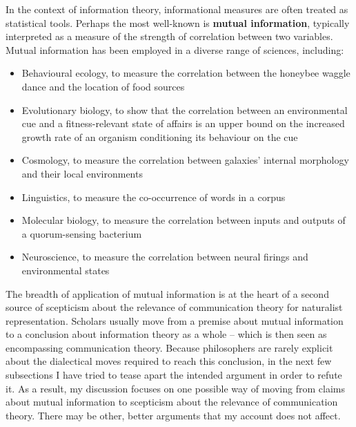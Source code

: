 

In the context of information theory, informational measures are often treated as statistical tools.
Perhaps the most well-known is \textbf{mutual information}, typically interpreted as a measure of the strength of correlation between two variables.
Mutual information has been employed in a diverse range of sciences, including:

\begin{itemize}
    \item Behavioural ecology, to measure the correlation between the honeybee waggle dance and the location of food sources \citep{haldane1954statistical}
    \item Evolutionary biology, to show that the correlation between an environmental cue and a fitness-relevant state of affairs is an upper bound on the increased growth rate of an organism conditioning its behaviour on the cue \citep{donaldson-matasci2010fitness}
    \item Cosmology, to measure the correlation between galaxies' internal morphology and their local environments \citep{pandey2017how}
    \item Linguistics, to measure the co-occurrence of words in a corpus \citep[$\S$4]{hunston2002corpora}
    \item Molecular biology, to measure the correlation between inputs and outputs of a quorum-sensing bacterium \citep{mehta2009information}
    \item Neuroscience, to measure the correlation between neural firings and environmental states \citep[][and references therein]{rathkopf2017neural}
\end{itemize}


\noindent The breadth of application of mutual information is at the heart of a second source of scepticism about the relevance of communication theory for naturalist representation.
Scholars usually move from a premise about mutual information to a conclusion about information theory as a whole -- which is then seen as encompassing communication theory.
Because philosophers are rarely explicit about the dialectical moves required to reach this conclusion, in the next few subsections I have tried to tease apart the intended argument in order to refute it.
As a result, my discussion focuses on one possible way of moving from claims about mutual information to scepticism about the relevance of communication theory.
There may be other, better arguments that my account does not affect.

